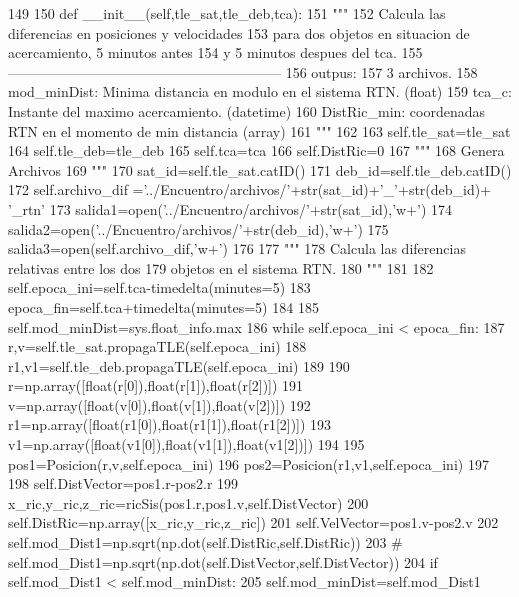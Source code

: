 \begin{DoxyCode}
149 
150     def __init__(self,tle_sat,tle_deb,tca):
151         """
152         Calcula las diferencias en posiciones y velocidades 
153         para dos objetos en situacion de acercamiento, 5 minutos antes
154         y 5 minutos despues del tca.
155         -----------------------------------------------------------
156         outpus:
157             3 archivos.
158             mod_minDist: Minima distancia en modulo en el sistema RTN. (float)
159             tca_c: Instante del maximo acercamiento. (datetime)
160             DistRic_min: coordenadas RTN en el momento de min distancia (array)
161         """
162         
163         self.tle_sat=tle_sat
164         self.tle_deb=tle_deb
165         self.tca=tca
166         self.DistRic=0         
167         """
168         Genera Archivos
169         """
170         sat_id=self.tle_sat.catID()
171         deb_id=self.tle_deb.catID()
172         self.archivo_dif ='../Encuentro/archivos/'+str(sat_id)+'_'+str(deb_id)+
      '_rtn'
173         salida1=open('../Encuentro/archivos/'+str(sat_id),'w+')
174         salida2=open('../Encuentro/archivos/'+str(deb_id),'w+')
175         salida3=open(self.archivo_dif,'w+')
176 
177         """
178         Calcula las diferencias relativas entre los dos 
179         objetos en el sistema RTN.
180         """
181 
182         self.epoca_ini=self.tca-timedelta(minutes=5)
183         epoca_fin=self.tca+timedelta(minutes=5)
184         
185         self.mod_minDist=sys.float_info.max
186         while self.epoca_ini < epoca_fin:
187             r,v=self.tle_sat.propagaTLE(self.epoca_ini)
188             r1,v1=self.tle_deb.propagaTLE(self.epoca_ini)
189             
190             r=np.array([float(r[0]),float(r[1]),float(r[2])])
191             v=np.array([float(v[0]),float(v[1]),float(v[2])])
192             r1=np.array([float(r1[0]),float(r1[1]),float(r1[2])])
193             v1=np.array([float(v1[0]),float(v1[1]),float(v1[2])])
194             
195             pos1=Posicion(r,v,self.epoca_ini)
196             pos2=Posicion(r1,v1,self.epoca_ini)
197             
198             self.DistVector=pos1.r-pos2.r
199             x_ric,y_ric,z_ric=ricSis(pos1.r,pos1.v,self.DistVector)
200             self.DistRic=np.array([x_ric,y_ric,z_ric])
201             self.VelVector=pos1.v-pos2.v
202             self.mod_Dist1=np.sqrt(np.dot(self.DistRic,self.DistRic))
203 #            self.mod_Dist1=np.sqrt(np.dot(self.DistVector,self.DistVector))
204             if self.mod_Dist1 < self.mod_minDist:
205                 self.mod_minDist=self.mod_Dist1

\end{DoxyCode}

